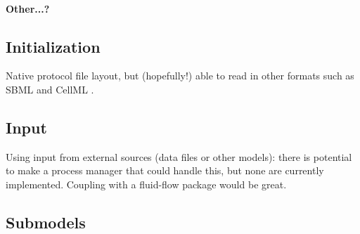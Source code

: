 \documentclass[10pt,letterpaper]{article}
\begin{document}
\paragraph{Other...?}

\subsection*{Initialization}
Native protocol file layout, but (hopefully!) able to read in other formats such as SBML \cite{Hucka2003} and CellML \cite{Cuellar2003}.

\subsection*{Input}
Using input from external sources (data files or other models): there is potential to make a process manager that could handle this, but none are currently implemented. Coupling with a fluid-flow package would be great.

\subsection*{Submodels}
\end{document}
